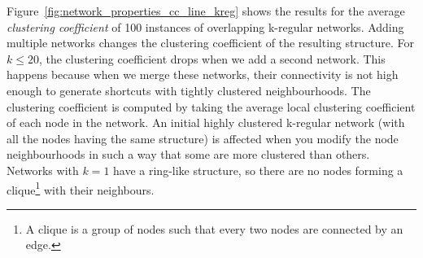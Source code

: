 \documentclass[preprint,number]{elsarticle}
\begin{document}
        \noindent Figure~\ref{fig:network_properties_cc_line_kreg} shows the results for the average
        \textit{clustering coefficient} of 100 instances of overlapping k-regular networks. Adding
        multiple networks changes the clustering coefficient of the resulting structure. For
        $k \le 20$, the clustering coefficient drops when we add a second network. This happens
        because when we merge these networks, their connectivity is not high enough to generate
        shortcuts with tightly clustered neighbourhoods. The clustering coefficient is computed by
        taking the average local clustering coefficient of each node in the network. An initial
        highly clustered k-regular network (with all the nodes having the same structure) is
        affected when you modify the node neighbourhoods in such a way that some are more clustered
        than others. Networks with $k=1$ have a ring-like structure, so there are no nodes forming a
        clique\footnote{A clique is a group of nodes such that every two nodes are connected by an
          edge.} with their neighbours.
\end{document}
